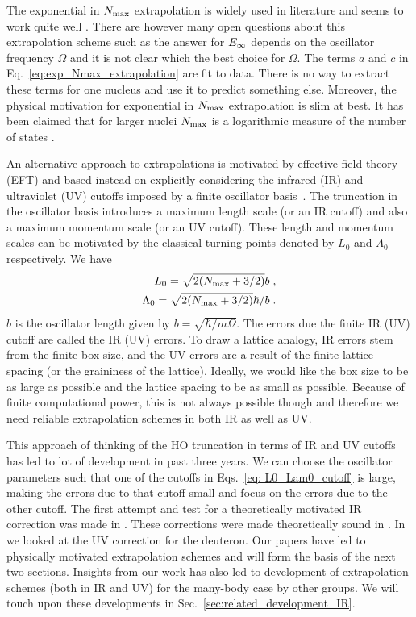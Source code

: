 	The exponential in ${N_{\mathrm{max}}}$ extrapolation is widely used in literature and
	seems to work quite well
	\cite{Hagen:2007hi,Bogner:2007rx,Forssen:2008qp,Maris:2008ax,Roth:2009cw}.
	There are however many open questions about this extrapolation scheme such as
	the answer for $E_{\infty}$ depends on the oscillator frequency $\Omega$ and it is
	not clear which the best choice for $\Omega$.  The terms $a$ and $c$ in
	Eq.~\eqref{eq:exp_Nmax_extrapolation} are fit to data.  There is no way to
	extract these terms for one nucleus and use it to predict something else.
	Moreover, the physical motivation for exponential in ${N_{\mathrm{max}}}$ extrapolation is
	slim at best.  It has been claimed that for larger nuclei ${N_{\mathrm{max}}}$ is a
	logarithmic measure of the number of states \cite{Bogner:2007rx}.

	An alternative approach to extrapolations is motivated by effective field
	theory (EFT) and based instead on explicitly considering the infrared (IR)
	and ultraviolet (UV) cutoffs imposed by a finite oscillator
	basis~\cite{Coon:2012ab}.  The truncation in the oscillator basis introduces
	a maximum length scale (or an IR cutoff) and also a maximum momentum scale
	(or an UV cutoff).  These length and momentum scales can be motivated by
	the classical turning points denoted by $L_0$ and $\Lambda_0$ respectively.
	We have
	\begin{align}
	L_0 = \sqrt{2 ({N_{\mathrm{max}}} + 3/2)} b \;, \nonumber \\
	\Lambda_0 = \sqrt{2 ({N_{\mathrm{max}}} + 3/2)} \hbar/b \;.
	\label{eq: L0_Lam0_cutoff}
	\end{align}
	$b$ is the oscillator length given by
	$\displaystyle b = \sqrt{\hbar/ m \Omega}$.
	The errors due the finite IR (UV) cutoff are called the IR (UV) errors.
	To draw a lattice analogy, IR errors stem from the finite box size,
	and the UV errors are a result of the finite lattice spacing (or the
	graininess of the lattice).  Ideally, we would like the box size to be as
	large as possible and the lattice spacing to be as small as possible.
	Because of finite computational power, this is not always possible though
	and therefore we need reliable extrapolation schemes in both IR as well as UV.

	This approach of thinking of the HO truncation in terms of IR and UV cutoffs
	has led to lot of development in past three years.
	We can choose the oscillator parameters such that one of the cutoffs in
	Eqs.~\eqref{eq: L0_Lam0_cutoff} is large, making the errors due to that cutoff
	small and focus on the errors due to the other cutoff.
	The first attempt and
	test for a theoretically motivated IR correction was made in
	\cite{Furnstahl2012}.  These corrections were made theoretically sound
	in \cite{More:2013rma, Furnstahl:2013vda}.  In \cite{Konig:2014hma} we looked
	at the UV correction for the deuteron.
	Our papers \cite{More:2013rma, Furnstahl:2013vda, Konig:2014hma} have led to
	physically motivated extrapolation schemes and will form the basis of the next
	two sections.  Insights from our work has also led to development of
	extrapolation schemes (both in IR and UV) for the many-body case by other
	groups.  We will touch upon these developments in
	Sec.~\ref{sec:related_development_IR}.

